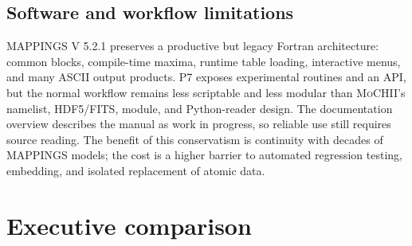 \documentclass[english,a4paper]{my_memo}
\newcommand{\MoCHII}{\textsc{MoCHII}}
\newcommand{\Mappings}{MAPPINGS V 5.2.1}
\begin{document}
\subsection{Software and workflow limitations}

\Mappings{} preserves a productive but legacy Fortran architecture:
common blocks, compile-time maxima, runtime table loading, interactive
menus, and many ASCII output products.  P7 exposes experimental routines
and an API, but the normal workflow remains less scriptable and less
modular than \MoCHII{}'s namelist, HDF5/FITS, module, and Python-reader
design.  The documentation overview describes the manual as work
in progress, so reliable use still requires source reading.  The benefit
of this conservatism is continuity with decades of MAPPINGS models; the
cost is a higher barrier to automated regression testing, embedding, and
isolated replacement of atomic data.

\section{Executive comparison}
\end{document}
